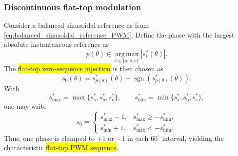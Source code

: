\begin{frame}
    \frametitle{Discontinuous flat-top modulation}
    Consider a balanced sinusoidal reference as from \eqref{eq:balanced_sinusoidal_reference_PWM}. Define the phase with the largest absolute instantaneous reference as
    \begin{equation}
        p(\theta)\in \operatorname*{arg\,max}_{i\in\{\mathrm{a,b,c}\}}\left|s_i^*(\theta)\right|.
    \end{equation}\pause
    The \hl{flat-top zero-sequence injection} is then chosen as
    \begin{equation}
        s_0(\theta)=s_{p(\theta)}^*(\theta)-\operatorname{sgn}\!\left(s_{p(\theta)}^*(\theta)\right).
        \label{eq:flat_top_zero_sequence_general}
    \end{equation}\pause
    With
    \begin{equation}
        s^*_{\max}=\max\{s_\mathrm{a}^*,s_\mathrm{b}^*,s_\mathrm{c}^*\}, \qquad
        s^*_{\min}=\min\{s_\mathrm{a}^*,s_\mathrm{b}^*,s_\mathrm{c}^*\},
    \end{equation}
    one may write
    \begin{equation}
        s_0=
        \begin{cases}
            s^*_{\max}-1, & s^*_{\max}\geq -s^*_{\min}, \\
            s^*_{\min}+1, & s^*_{\max}< -s^*_{\min}.
        \end{cases}
        \label{eq:flat_top_zero_sequence_piecewise}
    \end{equation}\pause
    Thus, one phase is clamped to \(+1\) or \(-1\) in each \(60^\circ\) interval, yielding the characteristic \hl{flat-top PWM sequence}.
\end{frame}

